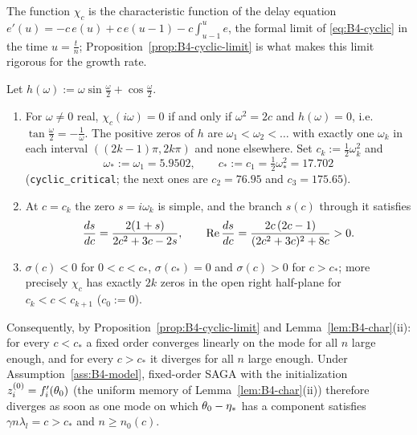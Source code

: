 The function $\chi_c$ is the characteristic function of the delay equation $e'(u)=-c\,e(u)+c\,e(u-1)-c\int_{u-1}^ue$, the formal limit of \eqref{eq:B4-cyclic} in the time $u=\frac tn$; Proposition~\ref{prop:B4-cyclic-limit} is what makes this limit rigorous for the growth rate.

\begin{proposition}\label{prop:B4-critical}
Let $h(\omega):=\omega\sin\frac\omega2+\cos\frac\omega2$.
\begin{enumerate}[label=(\roman*)]
\item For $\omega\ne0$ real, $\chi_c(i\omega)=0$ if and only if $\omega^2=2c$ and $h(\omega)=0$, i.e.\ $\tan\frac\omega2=-\frac1\omega$. The positive zeros of $h$ are $\omega_1<\omega_2<\dots$ with exactly one $\omega_k$ in each interval $((2k-1)\pi,2k\pi)$ and none elsewhere. Set $c_k:=\frac12\omega_k^2$ and
\[
\omega_\ast:=\omega_1=5.9502,\qquad c_\ast:=c_1=\tfrac12\omega_\ast^2=17.702
\]
(\texttt{cyclic\_critical}; the next ones are $c_2=76.95$ and $c_3=175.65$).
\item At $c=c_k$ the zero $s=i\omega_k$ is simple, and the branch $s(c)$ through it satisfies
\begin{equation}\label{eq:B4-crossing}
\frac{ds}{dc}=\frac{2(1+s)}{2c^2+3c-2s},\qquad \operatorname{Re}\frac{ds}{dc}=\frac{2c\,(2c-1)}{(2c^2+3c)^2+8c}>0 .
\end{equation}
\item $\sigma(c)<0$ for $0<c<c_\ast$, $\sigma(c_\ast)=0$ and $\sigma(c)>0$ for $c>c_\ast$; more precisely $\chi_c$ has exactly $2k$ zeros in the open right half-plane for $c_k<c<c_{k+1}$ ($c_0:=0$).
\end{enumerate}
Consequently, by Proposition~\ref{prop:B4-cyclic-limit} and Lemma~\ref{lem:B4-char}(ii): for every $c<c_\ast$ a fixed order converges linearly on the mode for all $n$ large enough, and for every $c>c_\ast$ it diverges for all $n$ large enough. Under Assumption~\ref{ass:B4-model}, fixed-order SAGA with the initialization $z_i^{(0)}=f'_i(\theta_0)$ (the uniform memory of Lemma~\ref{lem:B4-char}(ii)) therefore diverges as soon as one mode on which $\theta_0-\eta_\ast$ has a component satisfies $\gamma n\lambda_l=c>c_\ast$ and $n\ge n_0(c)$.
\end{proposition}

